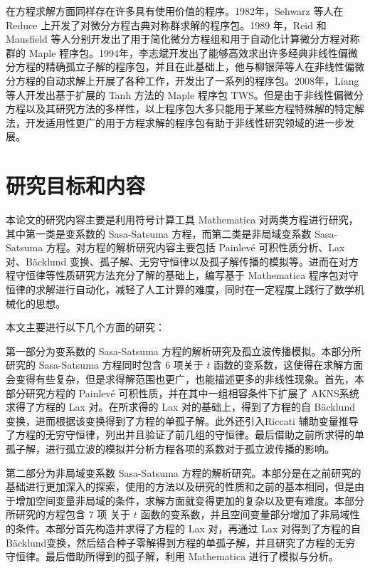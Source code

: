 在方程求解方面同样存在许多具有使用价值的程序。1982年，Sehwarz 等人在 Reduce 上开发了对微分方程古典对称群求解的程序包。1989 年，Reid 和 Mausfield 等人分别开发出了用于简化微分方程组和用于自动化计算微分方程对称群的  Maple 程序包。1994年，李志斌开发出了能够高效求出许多经典非线性偏微分方程的精确孤立子解的程序包，并且在此基础上，他与柳银萍等人在非线性偏微分方程的自动求解上开展了各种工作，开发出了一系列的程序包。2008年，Liang 等人开发出基于扩展的 Tanh 方法的 Maple 程序包 TWS。但是由于非线性偏微分方程以及其研究方法的多样性，以上程序包大多只能用于某些方程特殊解的特定解法，开发适用性更广的用于方程求解的程序包有助于非线性研究领域的进一步发展。

\section{研究目标和内容}

本论文的研究内容主要是利用符号计算工具 Mathematica 对两类方程进行研究，其中第一类是变系数的 Sasa-Satsuma 方程，而第二类是非局域变系数 Sasa-Satsuma 方程。对方程的解析研究内容主要包括  Painlev\'{e} 可积性质分析、Lax 对、B\"{a}cklund 变换、孤子解、无穷守恒律以及孤子解传播的模拟等。进而在对方程守恒律等性质研究方法充分了解的基础上，编写基于 Mathematica 程序包对守恒律的求解进行自动化，减轻了人工计算的难度，同时在一定程度上践行了数学机械化的思想。

本文主要进行以下几个方面的研究：

第一部分为变系数的 Sasa-Satsuma 方程的解析研究及孤立波传播模拟。本部分所研究的  Sasa-Satsuma 方程同时包含 6 项关于 $t$ 函数的变系数，这使得在求解方面会变得有些复杂，但是求得解范围也更广，也能描述更多的非线性现象。首先，本部分研究方程的 Painlev\'{e} 可积性质，并在其中一组相容条件下扩展了 AKNS系统求得了方程的 Lax 对。在所求得的 Lax 对的基础上，得到了方程的自 B\"{a}cklund变换，进而根据该变换得到了方程的单孤子解。此外还引入Riccati 辅助变量推导了方程的无穷守恒律，列出并且验证了前几组的守恒律。最后借助之前所求得的单孤子解，进行孤立波的模拟并分析方程各项的系数对于孤立波传播的影响。

第二部分为非局域变系数 Sasa-Satsuma 方程的解析研究。本部分是在之前研究的基础进行更加深入的探索，使用的方法以及研究的性质和之前的基本相同，但是由于增加空间变量非局域的条件，求解方面就变得更加的复杂以及更有难度。本部分所研究的方程包含 7 项 关于 $t$ 函数的变系数，并且空间变量部分增加了非局域性的条件。本部分首先构造并求得了方程的 Lax 对，再通过 Lax 对得到了方程的自 B\"{a}cklund变换，然后结合种子零解得到方程的单孤子解，并且研究了方程的无穷守恒律。最后借助所得到的孤子解，利用 Mathematica 进行了模拟与分析。

